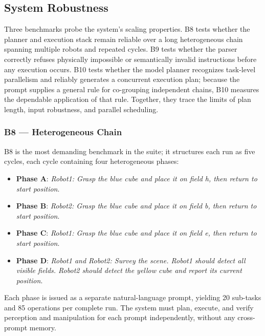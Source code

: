 \subsection{System Robustness}\label{sec:results-robustness}
Three benchmarks probe the system’s scaling properties. B8 tests whether the planner and execution stack remain reliable over a long heterogeneous chain spanning multiple robots and repeated cycles. B9 tests whether the parser correctly refuses physically impossible or semantically invalid instructions before any execution occurs. B10 tests whether the model planner recognizes task-level parallelism and reliably generates a concurrent execution plan; because the prompt supplies a general rule for co-grouping independent chains, B10 measures the dependable application of that rule. Together, they trace the limits of plan length, input robustness, and parallel scheduling.

\subsubsection{B8 — Heterogeneous Chain}
B8 is the most demanding benchmark in the suite; it structures each run as five cycles, each cycle containing four heterogeneous phases:

\begin{itemize}
	\item \textbf{Phase A}: \textit{Robot1: Grasp the blue cube and place it on field h, then return to start position}.
	\item \textbf{Phase B}: \textit{Robot2: Grasp the blue cube and place it on field b, then return to start position}.
	\item \textbf{Phase C}: \textit{Robot1: Grasp the blue cube and place it on field e, then return to start position}.
	\item \textbf{Phase D}: \textit{Robot1 and Robot2: Survey the scene. Robot1 should detect all visible fields. Robot2 should detect the yellow cube and report its current position}.
\end{itemize}

Each phase is issued as a separate natural-language prompt, yielding 20 sub-tasks and 85 operations per complete run. The system must plan, execute, and verify perception and manipulation for each prompt independently, without any cross-prompt memory.

